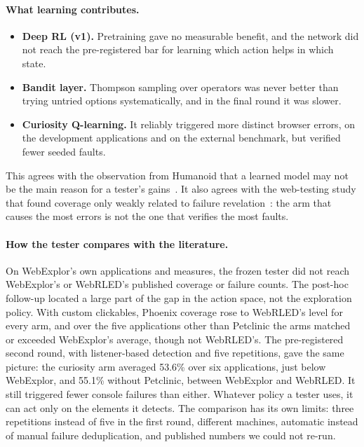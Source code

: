 \paragraph{What learning contributes.}
\begin{itemize}
  \item \textbf{Deep RL (v1).} Pretraining gave no measurable benefit, and the network did
        not reach the pre-registered bar for learning which action helps in which state.
  \item \textbf{Bandit layer.} Thompson sampling over operators was never better than trying
        untried options systematically, and in the final round it was slower.
  \item \textbf{Curiosity Q-learning.} It reliably triggered more distinct browser errors, on
        the development applications and on the external benchmark, but verified fewer
        seeded faults.
\end{itemize}
This agrees with the observation from Humanoid that a learned model may not be the main
reason for a tester's gains~\cite{li2019humanoid}. It also agrees with the web-testing study
that found coverage only weakly related to failure revelation~\cite{liu2026webgui}: the arm
that causes the most errors is not the one that verifies the most faults.

\paragraph{How the tester compares with the literature.} On WebExplor's own applications and
measures, the frozen tester did not reach WebExplor's or WebRLED's published coverage or
failure counts. The post-hoc follow-up located a large part of the gap in the action space,
not the exploration policy. With custom clickables, Phoenix coverage rose to WebRLED's
level for every arm, and over the five applications other than Petclinic the arms matched or
exceeded WebExplor's average, though not WebRLED's. The pre-registered second round, with
listener-based detection and five repetitions, gave the same picture: the curiosity arm
averaged 53.6\% over six applications, just below WebExplor, and 55.1\% without Petclinic,
between WebExplor and WebRLED. It still triggered fewer console failures than either.
Whatever policy a tester uses, it can act only on the elements it detects. The comparison
has its own limits: three repetitions instead of five in the first round, different
machines, automatic instead of manual failure deduplication, and published numbers we could
not re-run.

